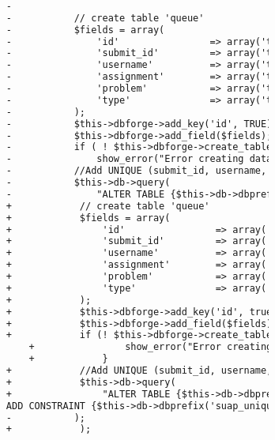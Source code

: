 \begin{lstlisting}[language=diff, caption=Perubahan pada kode Install.php]
						
						-
						-			// create table 'queue'
						-			$fields = array(
						-				'id'                => array('type' => 'INT', 'constraint' => 11, 'unsigned' => TRUE, 'auto_increment' => TRUE),
						-				'submit_id'         => array('type' => 'INT', 'constraint' => 11, 'unsigned' => TRUE),
						-				'username'          => array('type' => 'VARCHAR', 'constraint' => 20),
						-				'assignment'        => array('type' => 'SMALLINT', 'constraint' => 4, 'unsigned' => TRUE),
						-				'problem'           => array('type' => 'SMALLINT', 'constraint' => 4, 'unsigned' => TRUE),
						-				'type'              => array('type' => 'VARCHAR', 'constraint' => 8),
						-			);
						-			$this->dbforge->add_key('id', TRUE); // PRIMARY KEY
						-			$this->dbforge->add_field($fields);
						-			if ( ! $this->dbforge->create_table('queue', TRUE))
						-				show_error("Error creating database table ".$this->db->dbprefix('queue'));
						-			//Add UNIQUE (submit_id, username, assignment, problem) constraint
						-			$this->db->query(
						-				"ALTER TABLE {$this->db->dbprefix('queue')}
						+            // create table 'queue'
						+            $fields = array(
						+                'id'                => array('type' => 'INT', 'constraint' => 11, 'unsigned' => true, 'auto_increment' => true),
						+                'submit_id'         => array('type' => 'INT', 'constraint' => 11, 'unsigned' => true),
						+                'username'          => array('type' => 'VARCHAR', 'constraint' => 20),
						+                'assignment'        => array('type' => 'SMALLINT', 'constraint' => 4, 'unsigned' => true),
						+                'problem'           => array('type' => 'SMALLINT', 'constraint' => 4, 'unsigned' => true),
						+                'type'              => array('type' => 'VARCHAR', 'constraint' => 8),
						+            );
						+            $this->dbforge->add_key('id', true); // PRIMARY KEY
						+            $this->dbforge->add_field($fields);
						+            if (! $this->dbforge->create_table('queue', true)) {
							+                show_error("Error creating database table ".$this->db->dbprefix('queue'));
							+            }
						+            //Add UNIQUE (submit_id, username, assignment, problem) constraint
						+            $this->db->query(
						+                "ALTER TABLE {$this->db->dbprefix('queue')}
						ADD CONSTRAINT {$this->db->dbprefix('suap_unique')} UNIQUE (submit_id, username, assignment, problem);"
						-			);
						+            );
						
						
						

\end{lstlisting}

